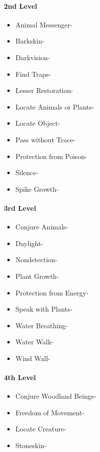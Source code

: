 \documentclass[
]{article}
\providecommand{\tightlist}{%
  \setlength{\itemsep}{0pt}\setlength{\parskip}{0pt}}
\begin{document}
\hypertarget{2nd-level-4}{%
\paragraph{2nd Level}\label{2nd-level-4}}

\begin{itemize}
\tightlist
\item
  Animal Messenger-
\item
  Barkskin-
\item
  Darkvision-
\item
  Find Traps-
\item
  Lesser Restoration-
\item
  Locate Animals or Plants-
\item
  Locate Object-
\item
  Pass without Trace-
\item
  Protection from Poison-
\item
  Silence-
\item
  Spike Growth-
\end{itemize}

\hypertarget{3rd-level-4}{%
\paragraph{3rd Level}\label{3rd-level-4}}

\begin{itemize}
\tightlist
\item
  Conjure Animals-
\item
  Daylight-
\item
  Nondetection-
\item
  Plant Growth-
\item
  Protection from Energy-
\item
  Speak with Plants-
\item
  Water Breathing-
\item
  Water Walk-
\item
  Wind Wall-
\end{itemize}

\hypertarget{4th-level-4}{%
\paragraph{4th Level}\label{4th-level-4}}

\begin{itemize}
\tightlist
\item
  Conjure Woodland Beings-
\item
  Freedom of Movement-
\item
  Locate Creature-
\item
  Stoneskin-
\end{itemize}
\end{document}
